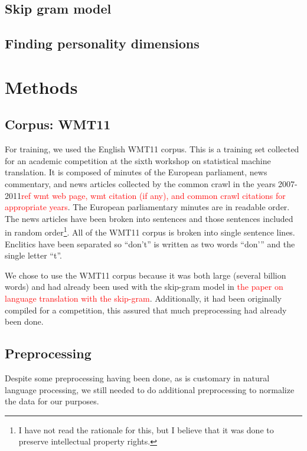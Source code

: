 \documentclass[10pt,letterpaper]{book}
\newcommand{\todo}[1]{\textcolor{red}{#1}}
\begin{document}
\section{Skip gram model}

\section{Finding personality dimensions}

\chapter{Methods}

\section{Corpus: WMT11}

For training, we used the English WMT11 corpus. This is a training set collected for an academic competition at the sixth workshop on statistical machine translation. It is composed of minutes of the European parliament, news commentary, and news articles collected by the common crawl in the years 2007-2011\todo{ref wmt web page, wmt citation (if any), and common crawl citations for appropriate years}. The European parliamentary minutes are in readable order. The news articles have been broken into sentences and those sentences included in random order\footnote{I have not read the rationale for this, but I believe that it was done to preserve intellectual property rights.}. All of the WMT11 corpus is broken into single sentence lines. Enclitics have been separated so ``don't'' is written as two words ``don'\phantom{}'' and the single letter ``t''.

We chose to use the WMT11 corpus because it was both large (several billion words) and had already been used with the skip-gram model in \todo{the paper on language translation with the skip-gram}. Additionally, it had been originally compiled for a competition, this assured that much preprocessing had already been done.

\section{Preprocessing}

Despite some preprocessing having been done, as is customary in natural language processing, we still needed to do additional preprocessing to normalize the data for our purposes.
\end{document}
